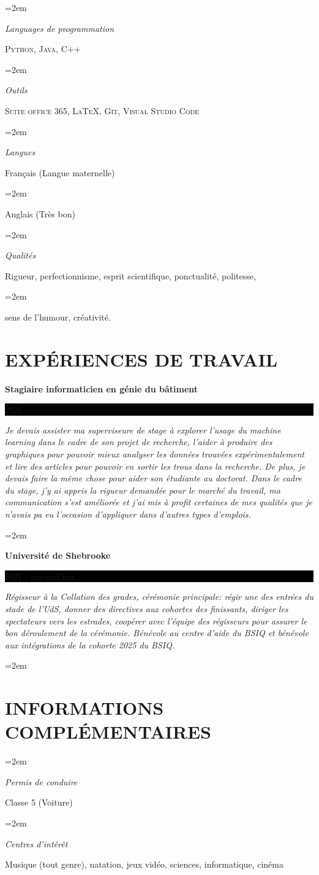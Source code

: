 \documentclass[paper=a4,fontsize=11pt]{scrartcl} %
\newlength{\spacebox}
\newcommand{\sepspace}{\vspace*{1em}}		%
\newcommand{\NewPart}[1]{\section*{\uppercase{#1}}}
\newcommand{\PersonalEntry}[2]{
		\noindent\hangindent=2em\hangafter=0 %
		\parbox{\spacebox}{        %
		\textit{#1}}		       %
		\hspace{1.5em} #2 \par}    %
\newcommand{\SkillsEntry}[2]{      %
		\noindent\hangindent=2em\hangafter=0 %
		\parbox{\spacebox}{        %
		\textit{#1}}			   %
		\hspace{1.5em} #2 \par}    %
\newcommand{\EducationEntry}[4]{
		\noindent \textbf{#1} \hfill      %
		\colorbox{Black}{%
			\parbox{6em}{%
			\hfill\color{White}#2}} \par  %
		\noindent \textit{#3} \par        %
		\noindent\hangindent=2em\hangafter=0 \small #4 %
		\normalsize \par}
\begin{document}
\SkillsEntry{Languages de programmation}{\textsc{Python}, \textsc{Java}, \textsc{C++}}
\sepspace
\SkillsEntry{Outils}{\textsc{Suite office 365}, \textsc{LaTeX}, \textsc{Git}, \textsc{Visual Studio Code}}
\sepspace
\SkillsEntry{Langues}{Français (Langue maternelle)}
\SkillsEntry{}{Anglais (Très bon)}
\sepspace
\SkillsEntry{Qualités}{Rigueur, perfectionnisme, esprit scientifique, ponctualité, politesse,}
\SkillsEntry{}{sens de l'humour, créativité.}
\newpage
\NewPart{Expériences de travail}{}
\EducationEntry{Stagiaire informaticien en génie du bâtiment}{2026}{Je devais assister ma superviseure de stage à explorer l'usage du machine learning dans le cadre de son projet de recherche, l'aider à produire des graphiques pour pouvoir mieux analyser les données trouvées expérimentalement et lire des articles pour pouvoir en sortir les trous dans la recherche. De plus, je devais faire la même chose pour aider son étudiante au doctorat. \newline Dans le cadre du stage, j'y ai appris la rigueur demandée pour le marché du travail, ma communication s'est améliorée et j'ai mis à profit certaines de mes qualités que je n'avais pa eu l'occasion d'appliquer dans d'autres types d'emplois.}{}
\EducationEntry{Université de Shebrooke}{2021 - aujourd'hui}{Régisseur à la Collation des grades, cérémonie principale: régir une des entrées du stade de l'UdS, donner des directives aux cohortes des finissants, diriger les spectateurs vers les estrades, coopérer avec l'équipe des régisseurs pour assurer le bon déroulement de la cérémonie. \newline Bénévole au centre d'aide du BSIQ et bénévole aux intégrations de la cohorte 2025 du BSIQ.}{}
\sepspace
\sepspace
\sepspace

\NewPart{Informations complémentaires}{}
\SkillsEntry{Permis de conduire}{Classe 5 (Voiture)}
\sepspace
\SkillsEntry{Centres d'intérêt}{Musique (tout genre), natation, jeux vidéo, sciences, informatique, cinéma}
\end{document}
